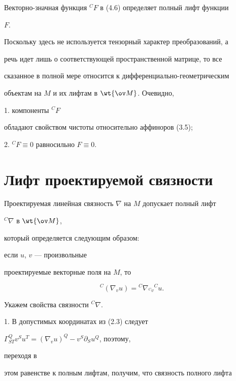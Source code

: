 Векторно-значная функция ${}^C F$ в (4.6) определяет полный лифт функции


$F$.


Поскольку здесь не используется тензорный характер преобразований, а


речь идет лишь о соответствующей пространственной матрице, то все


сказанное в полной мере относится к дифференциально-геометрическим


объектам на $M$ и их лифтам в $\wt{\ov M}$. Очевидно,





1. компоненты ${}^C F$


обладают свойством чистоты относительно аффиноров (3.5);





2. ${}^C F\equiv 0$ равносильно $F\equiv 0$.





\section{Лифт проектируемой связности}





Проектируемая линейная связность $\nabla$ на $M$ допускает полный лифт


${}^C\nabla$ в $\wt{\ov M}$,


который определяется следующим образом:


если $u$, $v$ --- произвольные


проектируемые векторные поля на $M$, то 


\begin{equation}


{}^C(\nabla_v u)={}^C\nabla_{{}^C v}{}^C u.


\end{equation}


Укажем свойства связности ${}^C\nabla$.





1. В допустимых координатах из (2.3) следует


$\Gamma^Q_{ST}v^S u^T=(\nabla_v u)^Q-v^S\partial_S u^Q$, поэтому,


переходя в


этом равенстве к полным лифтам, получим, что связность полного лифта


